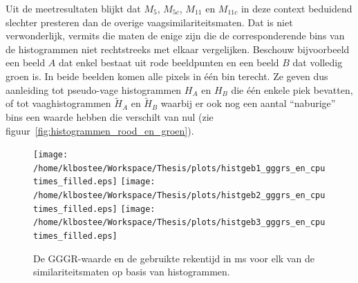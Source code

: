 Uit de meetresultaten blijkt dat $M_5$, $M_{5c}$, $M_{11}$ en $M_{11c}$ in deze context
beduidend slechter presteren dan de overige vaagsimilariteitsmaten. Dat is niet
verwonderlijk, vermits die maten de enige zijn die de corresponderende bins van de histogrammen 
niet rechtstreeks met elkaar vergelijken. Beschouw bijvoorbeeld een beeld $A$ dat enkel bestaat
uit rode beeldpunten en een beeld $B$ dat volledig groen is. In beide beelden komen alle
pixels in \'e\'en bin terecht. Ze geven dus aanleiding tot pseudo-vage histogrammen $H_A$ en $H_B$  
die \'e\'en enkele piek bevatten, of tot vaaghistogrammen $\widetilde{H}_A$ en $\widetilde{H}_B$ 
waarbij er ook nog een aantal ``naburige'' bins een waarde hebben die verschilt van nul 
(zie figuur~\ref{fig:histogrammen_rood_en_groen}). 
\begin{figure}[p]
\centering
\texttt{[image: /home/klbostee/Workspace/Thesis/plots/histgeb1\_gggrs\_en\_cputimes\_filled.eps]} 
\texttt{[image: /home/klbostee/Workspace/Thesis/plots/histgeb2\_gggrs\_en\_cputimes\_filled.eps]}
\texttt{[image: /home/klbostee/Workspace/Thesis/plots/histgeb3\_gggrs\_en\_cputimes\_filled.eps]}
\vspace{1pt}
\caption{\label{fig:histgeb_gggrs_en_cputimes}De GGGR-waarde en de gebruikte rekentijd in ms voor elk 
van de similariteitsmaten op basis van histogrammen.}
\end{figure}
%
